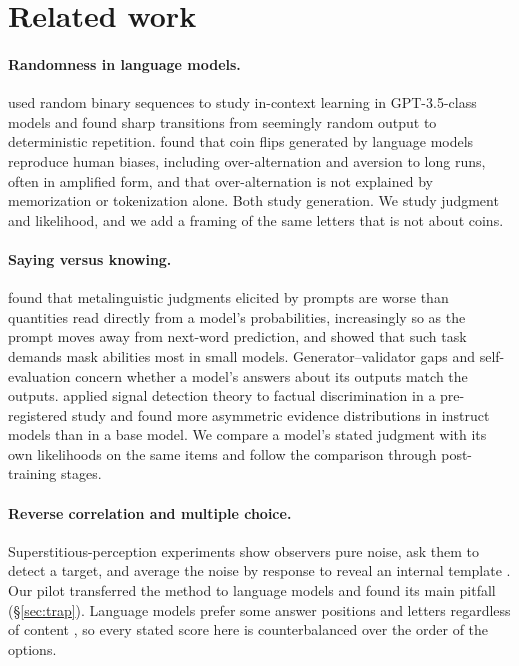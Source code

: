 \documentclass[11pt]{article}
\begin{document}
\section{Related work}

\paragraph{Randomness in language models.} \citet{bigelow2024incontext} used random binary sequences to study in-context learning in GPT-3.5-class models and found sharp transitions from seemingly random output to deterministic repetition. \citet{vankoevering2024heads} found that coin flips generated by language models reproduce human biases, including over-alternation and aversion to long runs, often in amplified form, and that over-alternation is not explained by memorization or tokenization alone. Both study generation. We study judgment and likelihood, and we add a framing of the same letters that is not about coins.

\paragraph{Saying versus knowing.} \citet{hu2023prompting} found that metalinguistic judgments elicited by prompts are worse than quantities read directly from a model's probabilities, increasingly so as the prompt moves away from next-word prediction, and \citet{hu2024auxiliary} showed that such task demands mask abilities most in small models. Generator--validator gaps \citep{li2024benchmarking,west2023generative} and self-evaluation \citep{kadavath2022language} concern whether a model's answers about its outputs match the outputs. \citet{cacioli2026signal} applied signal detection theory to factual discrimination in a pre-registered study and found more asymmetric evidence distributions in instruct models than in a base model. We compare a model's stated judgment with its own likelihoods on the same items and follow the comparison through post-training stages.

\paragraph{Reverse correlation and multiple choice.} Superstitious-perception experiments show observers pure noise, ask them to detect a target, and average the noise by response to reveal an internal template \citep{gosselin2003superstitious,liu2014seeing,murray2011classification}. Our pilot transferred the method to language models and found its main pitfall (\S\ref{sec:trap}). Language models prefer some answer positions and letters regardless of content \citep{zheng2024large}, so every stated score here is counterbalanced over the order of the options.
\end{document}
